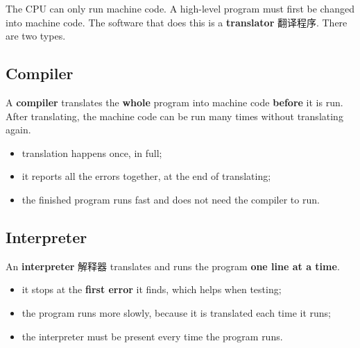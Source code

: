 \documentclass[11pt]{article}
\begin{document}
The CPU can only run machine code. A high-level program must first be changed into machine code. The software that does this is a \textbf{translator} 翻译程序. There are two types.

\subsection*{Compiler}

A \textbf{compiler} translates the \textbf{whole} program into machine code \textbf{before} it is run. After translating, the machine code can be run many times without translating again.

\begin{itemize}
\item translation happens once, in full;

\item it reports all the errors together, at the end of translating;

\item the finished program runs fast and does not need the compiler to run.

\end{itemize}

\subsection*{Interpreter}

An \textbf{interpreter} 解释器 translates and runs the program \textbf{one line at a time}.

\begin{itemize}
\item it stops at the \textbf{first error} it finds, which helps when testing;

\item the program runs more slowly, because it is translated each time it runs;

\item the interpreter must be present every time the program runs.

\end{itemize}

\begin{center}
\end{center}
\end{document}
